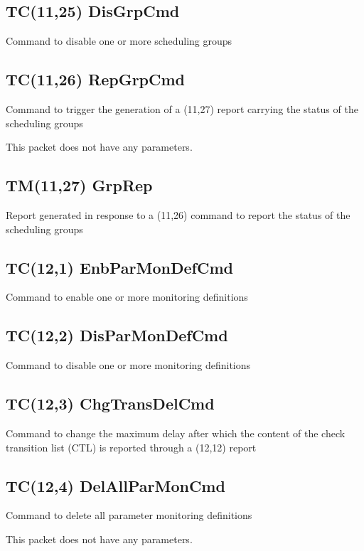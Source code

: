 \pagebreak
\subsection{TC(11,25) DisGrpCmd}
Command to disable one or more scheduling groups

\pagebreak
\subsection{TC(11,26) RepGrpCmd}
Command to trigger the generation of a (11,27) report carrying the status of the scheduling groups

This packet does not have any parameters.

\pagebreak
\subsection{TM(11,27) GrpRep}
Report generated in response to a (11,26) command to report the status of the scheduling groups

\pagebreak
\subsection{TC(12,1) EnbParMonDefCmd}
Command to enable one or more monitoring definitions

\pagebreak
\subsection{TC(12,2) DisParMonDefCmd}
Command to disable one or more monitoring definitions

\pagebreak
\subsection{TC(12,3) ChgTransDelCmd}
Command to change the maximum delay after which the content of the check transition list (CTL) is reported through a (12,12) report

\pagebreak
\subsection{TC(12,4) DelAllParMonCmd}
Command to delete all parameter monitoring definitions

This packet does not have any parameters.

